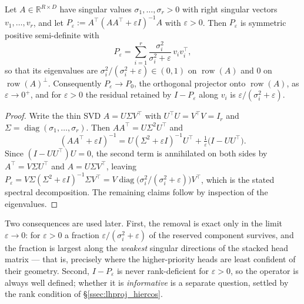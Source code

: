 \begin{proposition}
\label{prop:lhproj_operator}
Let $A\in\mathbb{R}^{R\times D}$ have singular values $\sigma_1,\dots,\sigma_r>0$
with right singular vectors $v_1,\dots,v_r$, and let
$P_\varepsilon:=A^{\top}(AA^{\top}+\varepsilon I)^{-1}A$ with $\varepsilon>0$.
Then $P_\varepsilon$ is symmetric positive semi-definite with
\[
P_\varepsilon=\sum_{i=1}^{r}\frac{\sigma_i^2}{\sigma_i^2+\varepsilon}\,v_iv_i^{\top},
\]
so that its eigenvalues are $\sigma_i^2/(\sigma_i^2+\varepsilon)\in(0,1)$ on
$\operatorname{row}(A)$ and $0$ on $\operatorname{row}(A)^{\perp}$. Consequently
$P_\varepsilon\to P_0$, the orthogonal projector onto $\operatorname{row}(A)$, as
$\varepsilon\to 0^{+}$, and for $\varepsilon>0$ the residual retained by
$I-P_\varepsilon$ along $v_i$ is $\varepsilon/(\sigma_i^2+\varepsilon)$.
\end{proposition}
\begin{proof}
Write the thin SVD $A=U\Sigma V^{\top}$ with $U^{\top}U=V^{\top}V=I_r$ and
$\Sigma=\operatorname{diag}(\sigma_1,\dots,\sigma_r)$. Then
$AA^{\top}=U\Sigma^{2}U^{\top}$ and
\[
(AA^{\top}+\varepsilon I)^{-1}
=U(\Sigma^{2}+\varepsilon I)^{-1}U^{\top}+\tfrac{1}{\varepsilon}\big(I-UU^{\top}\big).
\]
Since $(I-UU^{\top})U=0$, the second term is annihilated on both sides by
$A^{\top}=V\Sigma U^{\top}$ and $A=U\Sigma V^{\top}$, leaving
$P_\varepsilon=V\Sigma(\Sigma^{2}+\varepsilon I)^{-1}\Sigma V^{\top}
=V\operatorname{diag}\big(\sigma_i^2/(\sigma_i^2+\varepsilon)\big)V^{\top}$,
which is the stated spectral decomposition. The remaining claims follow by
inspection of the eigenvalues.
\end{proof}

Two consequences are used later. First, the removal is exact only in the limit
$\varepsilon\to0$: for $\varepsilon>0$ a fraction
$\varepsilon/(\sigma_i^2+\varepsilon)$ of the reserved component survives, and the
fraction is largest along the \emph{weakest} singular directions of the stacked
head matrix --- that is, precisely where the higher-priority heads are least
confident of their geometry. Second, $I-P_\varepsilon$ is never rank-deficient for
$\varepsilon>0$, so the operator is always well defined; whether it is
\emph{informative} is a separate question, settled by the rank condition of
\S\ref{ssec:lhproj_hiercos}.

